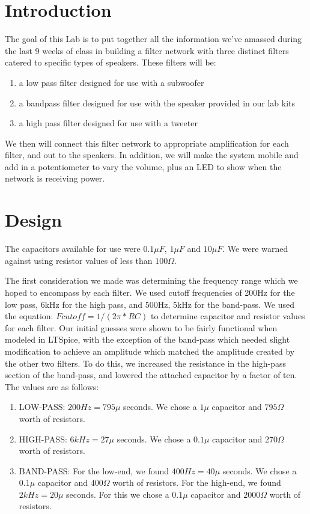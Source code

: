 \documentclass{article}
\title{Chapter #6 Lab Writeup}
\author{Zach Thompson, Simon Hannes, Kyle Peterson}
\begin{document}
\maketitle{}

\section*{Introduction}
The goal of this Lab is to put together all the information we've amassed 
during the last 9 weeks of class in building a filter network with three
distinct filters catered to specific types of speakers. These filters will
be:
\begin{enumerate}
\item a low pass filter designed for use with a subwoofer
\item a bandpass filter designed for use with the speaker provided in our lab kits
\item a high pass filter designed for use with a tweeter
\end{enumerate}

We then will connect this filter network to appropriate amplification for each 
filter, and out to the speakers. In addition, we will make the system mobile
 and add in a potentiometer to vary the volume, plus an LED to show when the 
network is receiving power.

\section*{Design}
The capacitors available for use were $0.1\mu F$, $1\mu F$ and $10\mu F$. We 
were warned against using resistor values of less than $100\Omega$.

The first consideration we made was determining the frequency range which 
we hoped to encompass by each filter. We used cutoff frequencies of 200Hz
for the low pass, 6kHz for the high pass, and 500Hz, 5kHz for the band-pass.
We used the equation: $Fcutoff = 1/(2\pi*RC)$ to determine capacitor and 
resistor values for each filter. Our initial guesses were shown to be fairly 
functional when modeled in LTSpice, with the exception of the band-pass which 
needed slight modification to achieve an amplitude which matched the amplitude 
created by the other two  filters. To do this, we increased the resistance
in the high-pass section of  the band-pass, and lowered the attached capacitor
by a factor of ten. The values are as follows:
\begin{enumerate}
\item LOW-PASS: $200Hz=795\mu$ seconds. We chose a $1\mu$ capacitor and 
$795\Omega$ worth of resistors.
\item HIGH-PASS: $6kHz=27\mu$ seconds. We chose a $0.1\mu$ capacitor and 
$270\Omega$ worth of resistors. 
\item BAND-PASS: For the low-end, we found $400Hz=40\mu$ seconds. We chose a 
$0.1\mu$ capacitor and $400\Omega$ worth of resistors. For the high-end, we found
$2kHz=20\mu$ seconds. For this we chose a $0.1\mu$ capacitor and $2000\Omega$
worth of resistors.
\end{enumerate}
\end{document}
